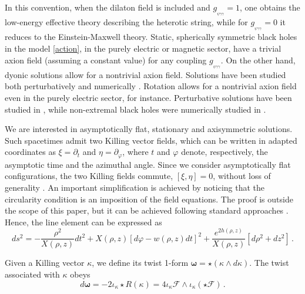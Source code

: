 \documentclass[11pt]{article}
\numberwithin{equation}{section} %
\begin{document}
In this convention, when the dilaton field is included and $g_{_{\psi\gamma\gamma}}=1$, one obtains the low-energy effective
theory describing the heterotic string, while for $g_{_{\psi\gamma\gamma}}=0$ it reduces to the Einstein-Maxwell theory. Static, spherically symmetric black holes in the model \eqref{action}, in the purely electric or magnetic sector, have a trivial axion field (assuming a constant value) for any coupling $g_{_{\psi\gamma\gamma}}$. On the other hand, dyonic solutions allow for a nontrivial axion field. Solutions have been studied both perturbatively and numerically \cite{Lee:1991jw,Balakin:2017nbg,Nakarachinda:2025bvy,Fernandes:2019kmh}. Rotation allows for a nontrivial axion field even in the purely electric sector, for instance. Perturbative solutions have been studied in \cite{Boskovic:2018lkj,KIczek:2021vlc}, while non-extremal black holes were numerically studied in \cite{Burrage:2023zvk}.

We are interested in asymptotically flat, stationary and axisymmetric solutions. Such spacetimes admit two Killing vector fields, which can be written in adapted coordinates as
\(\xi = \partial_t\) and \(\eta = \partial_\varphi\), where \(t\) and \(\varphi\) denote, respectively, the asymptotic time and the azimuthal angle. Since we consider asymptotically flat configurations, the two Killing fields commute, \([\xi,\eta]=0\), without loss of generality \cite{Carter:1970ea}. An important simplification is achieved by noticing that the circularity condition is an imposition of the field equations. The proof is outside the scope of this paper, but it can be achieved following standard approaches \cite{heusler_1996,Kundt:1966zz,Carter:1969zz,Carter:2009nex,Bokulic:2023oxw,Herdeiro:2025blx,Straumann:2013spu}. Hence, the line element can be expressed as
%
\begin{equation}
\label{m1}
d s^2=-\frac{\rho^2}{X(\rho, z)} d t^2+X(\rho, z)[d \varphi-w(\rho, z) d t]^2+\frac{e^{2 h(\rho, z)}}{X(\rho, z)}\left[d \rho^2+d z^2\right]\,.
\end{equation}
%

Given a Killing vector \(\kappa\), we define its twist 1-form
\(\boldsymbol{\omega} = \star(\kappa \wedge d\kappa)\).  
The twist associated with \(\kappa\) obeys
%
\begin{equation}\label{domega}
 d\boldsymbol{\omega}=-2\iota_\kappa\star R(\kappa)=4 \iota_\kappa\mathcal{F}\land\iota_\kappa\left(\star\mathcal{F}\right)\,.
\end{equation}
\end{document}
